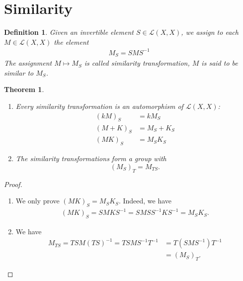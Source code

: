 \documentclass[11pt]{book}
\newtheorem{definition}{Definition}[section]
\newtheorem{theorem}{Theorem}[section]
\theoremstyle{definition}
\numberwithin{equation}{subsection}
\begin{document}
\medskip

\section{Similarity}
\begin{definition}\label{similarity}
Given an invertible element $S\in \mathscr{L}(X, X)$, we assign to each $M\in \mathscr{L}(X,X)$ the element
\begin{align*}
    M_S = SMS^{-1}
\end{align*}
The assignment $M\mapsto M_S$ is called similarity transformation, $M$ is said to be similar to $M_S$.
\end{definition}

\medskip

\begin{theorem}
~\begin{enumerate}[label=(\alph*)]
    \item Every similarity transformation is an automorphism of $\mathscr{L}(X,X)$:
    \begin{align*}
        (kM)_S & = kM_S\\
        (M+K)_S & = M_S + K_S\\
        (MK)_S & = M_S K_S
    \end{align*}
    \item The similarity transformations form a group with $$(M_S)_T = M_{TS}.$$
\end{enumerate}
\end{theorem}
\begin{proof}
~\begin{enumerate}[label=(\alph*)]
    \item We only prove $(MK)_S = M_S K_S$. Indeed, we have 
    \begin{align*}
        (MK)_S = S M K S^{-1} = S M S S^{-1} K S^{-1} = M_S K_S.
    \end{align*}
    \item We have 
    \begin{align*}
        M_{TS} = TS M (TS)^{-1} = TS M S^{-1} T^{-1} & = T(S M S^{-1}) T^{-1} \\
        & = (M_S)_T.
    \end{align*}
\end{enumerate}
\end{proof}

\medskip
\end{document}
